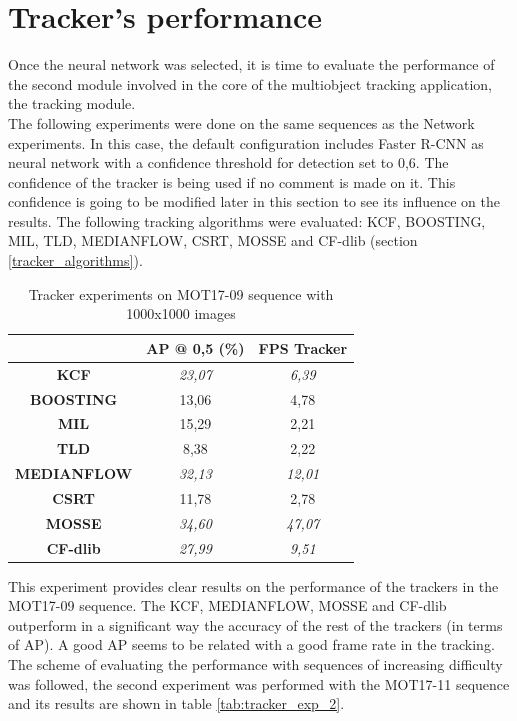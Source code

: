 \section{Tracker's performance}
Once the neural network was selected, it is time to evaluate the performance of the second module involved in the core of the multiobject tracking application, the tracking module.\\
The following experiments were done on the same sequences as the Network experiments. In this case, the default configuration includes Faster R-CNN as neural network with a confidence threshold for detection set to 0,6. The confidence of the tracker is being used if no comment is made on it. This confidence is going to be modified later in this section to see its influence on the results. The following tracking algorithms were evaluated: KCF, BOOSTING, MIL, TLD, MEDIANFLOW, CSRT, MOSSE and CF-dlib (section \ref{tracker_algorithms}).\\
\begin{table}[H]
\scriptsize
\begin{center}
\begin{tabular}{|c|c|c|}
\hline
\textbf{}           & \textbf{AP @ 0,5 (\%)} & \textbf{FPS Tracker} \\ \hline
\textbf{KCF}        & \textit{23,07}         & \textit{6,39}        \\ \hline
\textbf{BOOSTING}   & 13,06                  & 4,78                 \\ \hline
\textbf{MIL}        & 15,29                  & 2,21                 \\ \hline
\textbf{TLD}        & 8,38                   & 2,22                 \\ \hline
\textbf{MEDIANFLOW} & \textit{32,13}         & \textit{12,01}       \\ \hline
\textbf{CSRT}       & 11,78                  & 2,78                 \\ \hline
\textbf{MOSSE}      & \textit{34,60}         & \textit{47,07}       \\ \hline
\textbf{CF-dlib}    & \textit{27,99}         & \textit{9,51}        \\ \hline
\end{tabular}
\end{center}
\caption{Tracker experiments on MOT17-09 sequence with 1000x1000 images}
\label{tab:tracker_exp_1}
\end{table}
This experiment provides clear results on the performance of the trackers in the MOT17-09 sequence. The KCF, MEDIANFLOW, MOSSE and CF-dlib outperform in a significant way the accuracy of the rest of the trackers (in terms of AP). A good AP seems to be related with a good frame rate in the tracking.\\
The scheme of evaluating the performance with sequences of increasing difficulty was followed, the second experiment was performed with the MOT17-11 sequence and its results are shown in table \ref{tab:tracker_exp_2}.

